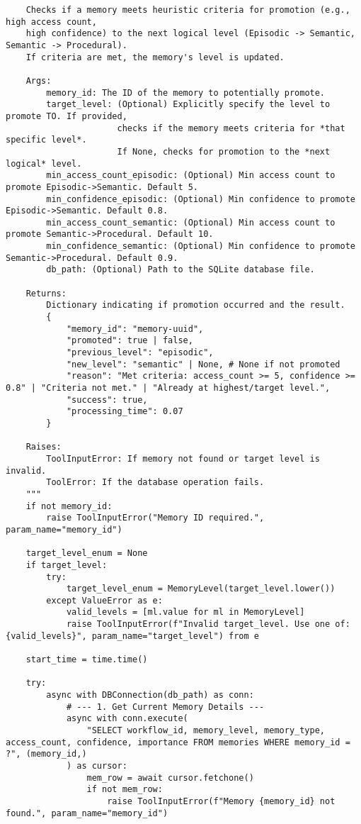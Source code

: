 \documentclass[12pt,a4paper]{article}
\begin{document}
\begin{pageablecode}
\begin{verbatim}
    Checks if a memory meets heuristic criteria for promotion (e.g., high access count,
    high confidence) to the next logical level (Episodic -> Semantic, Semantic -> Procedural).
    If criteria are met, the memory's level is updated.

    Args:
        memory_id: The ID of the memory to potentially promote.
        target_level: (Optional) Explicitly specify the level to promote TO. If provided,
                      checks if the memory meets criteria for *that specific level*.
                      If None, checks for promotion to the *next logical* level.
        min_access_count_episodic: (Optional) Min access count to promote Episodic->Semantic. Default 5.
        min_confidence_episodic: (Optional) Min confidence to promote Episodic->Semantic. Default 0.8.
        min_access_count_semantic: (Optional) Min access count to promote Semantic->Procedural. Default 10.
        min_confidence_semantic: (Optional) Min confidence to promote Semantic->Procedural. Default 0.9.
        db_path: (Optional) Path to the SQLite database file.

    Returns:
        Dictionary indicating if promotion occurred and the result.
        {
            "memory_id": "memory-uuid",
            "promoted": true | false,
            "previous_level": "episodic",
            "new_level": "semantic" | None, # None if not promoted
            "reason": "Met criteria: access_count >= 5, confidence >= 0.8" | "Criteria not met." | "Already at highest/target level.",
            "success": true,
            "processing_time": 0.07
        }

    Raises:
        ToolInputError: If memory not found or target level is invalid.
        ToolError: If the database operation fails.
    """
    if not memory_id:
        raise ToolInputError("Memory ID required.", param_name="memory_id")

    target_level_enum = None
    if target_level:
        try:
            target_level_enum = MemoryLevel(target_level.lower())
        except ValueError as e:
            valid_levels = [ml.value for ml in MemoryLevel]
            raise ToolInputError(f"Invalid target_level. Use one of: {valid_levels}", param_name="target_level") from e

    start_time = time.time()

    try:
        async with DBConnection(db_path) as conn:
            # --- 1. Get Current Memory Details ---
            async with conn.execute(
                "SELECT workflow_id, memory_level, memory_type, access_count, confidence, importance FROM memories WHERE memory_id = ?", (memory_id,)
            ) as cursor:
                mem_row = await cursor.fetchone()
                if not mem_row:
                    raise ToolInputError(f"Memory {memory_id} not found.", param_name="memory_id")


\end{verbatim}
\end{pageablecode}
\end{document}
